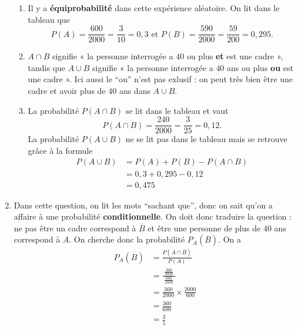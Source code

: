 \documentclass[11pt]{article}
\begin{document}
\begin{enumerate}
\begin{enumerate}
    \item Il y a \textbf{équiprobabilité} dans cette expérience aléatoire. On
      lit dans le tableau que
      \[
        P(A)=\frac{600}{2000}=\frac{3}{10}=0,3
        \text{ et }
        P(B)=\frac{590}{2000}=\frac{59}{200}=0,295.
    \]
  \item $A\cap B$ signifie « la personne interrogée a $40$ ou plus
    \textbf{et} est une cadre », tandis que $A\cup B$ signifie « la personne
    interrogée a $40$ ans ou plus \textbf{ou} est une cadre ». Ici aussi le
    ``ou'' n'est pas exlusif : on peut très bien être une cadre et avoir plus de
    $40$ ans dans $A\cup B$.
  \item La probabilité $P(A\cap B)$ se lit dans le tableau et vaut
    \[
      P(A\cap B) = \frac{240}{2000}=\frac{3}{25}=0,12.
    \]
    La probabilité $P(A\cup B)$ ne se lit pas dans le tableau mais se retrouve
    gr\^ace à la formule
    \begin{align*}
      P(A\cup B) &= P(A)+P(B)-P(A\cap B)\\
      &= 0,3+0,295-0,12\\
      &= 0,475
    \end{align*}
  \end{enumerate}
\item Dans cette question, on lit les mots ``sachant que'', donc on sait qu'on a
  affaire à une probabilité \textbf{conditionnelle}. On doit donc traduire la
  question : ne pas être un cadre correspond à $\overline B$ et être une
  personne de plus de $40$ ans correspond à $A$. On cherche donc la probabilité
  $P_A(\overline B)$.
  On a
  \begin{align*}
    P_A(\overline B) &= \frac{P(A\cap\overline B)}{P(A)} \\
    &= \frac{\;\frac{360}{2000}\;}{\frac{600}{2000}} \\
    &= \frac{360}{2000}\times\frac{2000}{600} \\
    &= \frac{360}{600} \\
    &= \frac{3}{5}
  \end{align*}
\end{enumerate}
\end{document}
